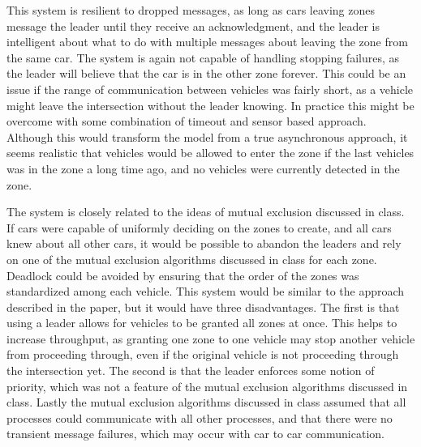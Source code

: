 \documentclass[12pt]{article}
\begin{document}
This system is resilient to dropped messages, as long as cars leaving zones message the leader until they receive an acknowledgment, and the leader is intelligent about what to do with multiple messages about leaving the zone from the same car. The system is again not capable of handling stopping failures, as the leader will believe that the car is in the other zone forever. This could be an issue if the range of communication between vehicles was fairly short, as a vehicle might leave the intersection without the leader knowing. In practice this might be overcome with some combination of timeout and sensor based approach. Although this would transform the model from a true asynchronous approach, it seems realistic that vehicles would be allowed to enter the zone if the last vehicles was in the zone a long time ago, and no vehicles were currently detected in the zone. \par
The system is closely related to the ideas of mutual exclusion discussed in class. If cars were capable of uniformly deciding on the zones to create, and all cars knew about all other cars, it would be possible to abandon the leaders and rely on one of the mutual exclusion algorithms discussed in class for each zone. Deadlock could be avoided by ensuring that the order of the zones was standardized among each vehicle. This system would be similar to the approach described in the paper, but it would have three disadvantages. The first is that using a leader allows for vehicles to be granted all zones at once. This helps to increase throughput, as granting one zone to one vehicle may stop another vehicle from proceeding through, even if the original vehicle is not proceeding through the intersection yet. The second is that the leader enforces some notion of priority, which was not a feature of the mutual exclusion algorithms discussed in class. Lastly the mutual exclusion algorithms discussed in class assumed that all processes could communicate with all other processes, and that there were no transient message failures, which may occur with car to car communication.
\end{document}
